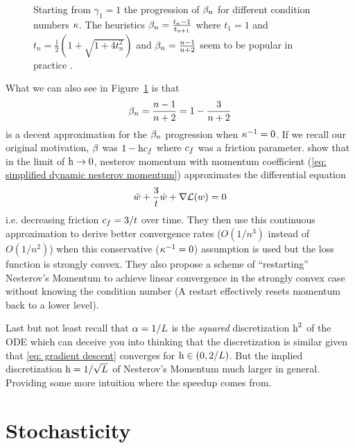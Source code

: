 \begin{figure}[h]
	\centering
	\def\svgwidth{1\textwidth}
	
	\caption{
		Starting from \(\gamma_1=1\) the progression of \(\beta_n\) for
		different condition numbers \(\kappa\). The heuristics
		\(\beta_n=\frac{t_n-1}{t_{n+1}}\) where \(t_1=1\) and
		\(t_n=\tfrac12(1+\sqrt{1+4t_n^2})\) and \(\beta_n=\frac{n-1}{n+2}\)
		seem to be popular in practice \parencite{rechtOptimization2013}.
	}
	\label{fig: momentum progression}
\end{figure}

What we can also see in Figure~\ref{fig: momentum progression} is that
\begin{align}\label{eq: simplified dynamic nesterov momentum}
	\beta_n = \frac{n-1}{n+2} = 1-\frac{3}{n+2}
\end{align}
is a decent approximation for the \(\beta_n\) progression when \(\kappa^{-1}=0\).
If we recall our original motivation, \(\beta\) was \(1-\text{h}c_f\) where
\(c_f\) was a friction parameter. \textcite{suDifferentialEquationModeling2015}
show that in the limit of \(\text{h}\to0\), nesterov momentum with momentum
coefficient (\ref{eq: simplified dynamic nesterov momentum}) approximates the
differential equation
\begin{align*}
	\ddot{w} + \frac{3}{t}\dot{w} + \nabla\mathcal{L}(w) = 0
\end{align*}
i.e. decreasing friction \(c_f=3/t\) over time. They then use this
continuous approximation to derive better convergence rates (\(O(1/n^3)\) instead of
\(O(1/n^2)\)) when this conservative (\(\kappa^{-1}=0\)) assumption is used
but the loss function is strongly convex. They also propose a scheme of
``restarting'' Nesterov's Momentum to achieve linear convergence in the
strongly convex case without knowing the condition number (A restart effectively
resets momentum back to a lower level).

Last but not least recall that \(\alpha=1/L\) is the \emph{squared}
discretization \(\text{h}^2\) of the ODE which can deceive you into thinking that the
discretization is similar given that \ref{eq: gradient descent} converges for \(\text{h} \in
(0,2/L)\). But the implied discretization \(\text{h}=1/\sqrt{L}\) of
Nesterov's Momentum much larger in general. Providing some more intuition where the
speedup comes from.


\section{Stochasticity}

